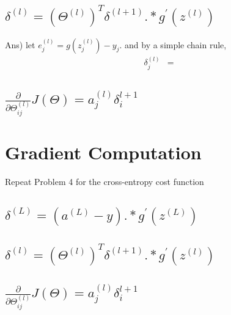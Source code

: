 \documentclass[12pt]{article}%
\begin{document}
\subsection{$\delta^{(l)} = (\Theta^{(l)})^{T} \delta^{(l+1)}.*g^{'}(z^{(l)})$}
Ans) let $e^{(l)}_j = g(z^{(l)}_j) - y_j$. and by a simple chain rule, 
\begin{equation}
	\begin{aligned}
		\delta^{(l)}_j & = 
	\end{aligned}
\end{equation}
\subsection{$\frac{\partial}{\partial \Theta_{ij}^{(l)}} J(\Theta) = a_{j}^{(l)} \delta_{i}^{l+1}$}

\section{Gradient Computation}
Repeat Problem 4 for the cross-entropy cost function
\subsection{$\delta^{(L)} = (a^{(L)} - y).*g^{'}(z^{(L)})$}
\subsection{$\delta^{(l)} = (\Theta^{(l)})^{T} \delta^{(l+1)}.*g^{'}(z^{(l)})$}
\subsection{$\frac{\partial}{\partial \Theta_{ij}^{(l)}} J(\Theta) = a_{j}^{(l)} \delta_{i}^{l+1}$}
\end{document}
